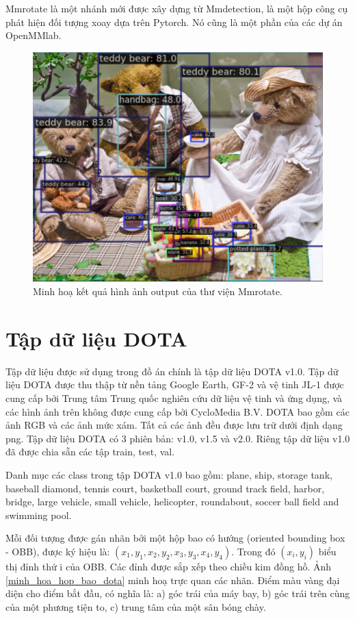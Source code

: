 \documentclass[12pt,a4paper,openany,oneside]{report}
\begin{document}
Mmrotate là một nhánh mới được xây dựng từ Mmdetection, là một hộp công cụ phát hiện đối tượng xoay dựa trên Pytorch. Nó cũng là một phần của các dự án OpenMMlab.

\begin{figure}[ht!]
	\begin{center}
		\includegraphics[width=445px]{./demo_mmrotate_result.jpg}
		\caption{Minh hoạ kết quả hình ảnh output của thư viện Mmrotate.}
		\label{demo_mmrotate_result}
	\end{center}
\end{figure} 

\section{Tập dữ liệu DOTA} 

Tập dữ liệu được sử dụng trong đồ án chính là tập dữ liệu DOTA v1.0. Tập dữ liệu DOTA được thu thập từ nền tảng Google Earth, GF-2 và vệ tinh JL-1 được cung cấp bởi Trung tâm Trung quốc nghiên cứu dữ liệu vệ tinh và ứng dụng, và các hình ảnh trên không được cung cấp bởi CycloMedia B.V. DOTA bao gồm các ảnh RGB và các ảnh mức xám. Tất cả các ảnh đều được lưu trữ dưới định dạng png. Tập dữ liệu DOTA có 3 phiên bản: v1.0, v1.5 và v2.0. Riêng tập dữ liệu v1.0 đã được chia sẵn các tập train, test, val.

Danh mục các class trong tập DOTA v1.0 bao gồm: plane, ship, storage tank, baseball diamond, tennis court, basketball court, ground track field, harbor, bridge, large vehicle, small vehicle, helicopter, roundabout, soccer ball field and swimming pool.

Mỗi đối tượng được gán nhãn bởi một hộp bao có hướng (oriented bounding box - OBB), được ký hiệu là: $(x_1, y_1, x_2, y_2, x_3, y_3, x_4, y_4)$. Trong đó $(x_i, y_i)$ biểu thị đỉnh thứ i của OBB. Các đỉnh được sắp xếp theo chiều kim đồng hồ. Ảnh \ref{minh_hoa_hop_bao_dota} minh hoạ trực quan các nhãn. Điểm màu vàng đại diện cho điểm bắt đầu, có nghĩa là: a) góc trái của máy bay, b) góc trái trên cùng của một phương tiện to, c) trung tâm của một sân bóng chày.
\end{document}
